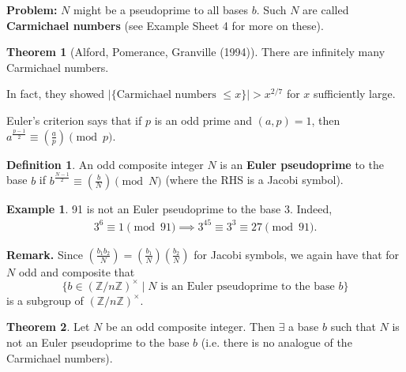 \documentclass{article}
\theoremstyle{definition}
\newtheorem{theorem}{Theorem}[section]
\newtheorem{example}{Example}[section]
\newtheorem{defn}{Definition}[section]
\begin{document}
\textbf{Problem:} $N$ might be a pseudoprime to all bases $b$. Such $N$ are called \textbf{Carmichael numbers} (see Example Sheet 4 for more on these).

\begin{theorem}[Alford, Pomerance, Granville (1994)]
    There are infinitely many Carmichael numbers.
\end{theorem}
In fact, they showed $|\{\text{Carmichael numbers }\le x\}|>x^{2/7}$ for $x$ sufficiently large.
\vspace{1mm}

Euler's criterion says that if $p$ is an odd prime and $(a,p)=1$, then $a^{\frac{p-1}{2}} \equiv \left( \frac{a}{p} \right) \pmod{p}$.
\begin{defn}
    An odd composite integer $N$ is an \textbf{Euler pseudoprime} to the base $b$ if $b^{\frac{N-1}{2}} \equiv \left( \frac{b}{N} \right) \pmod{N}$ (where the RHS is a Jacobi symbol). 
\end{defn}
\begin{example}
    91 is not an Euler pseudoprime to the base 3. Indeed,
    \begin{align*}
        3^6 \equiv 1 \pmod{91} \implies 3^{45} \equiv 3^{3} \equiv 27 \pmod{91}.
    \end{align*}
\end{example}
\textbf{Remark.} Since $\left( \frac{b_1b_2}{N} \right) =\left( \frac{b_1}{N} \right) \left( \frac{b_2}{N} \right)$ for Jacobi symbols, we again have that for $N$ odd and composite that \[
\{b \in (\mathbb{Z}/n\mathbb{Z})^\times \mid N\text{ is an Euler pseudoprime to the base }b\}
\]
is a subgroup of $(\mathbb{Z}/n\mathbb{Z})^\times$.
\begin{theorem}
    Let $N$ be an odd composite integer. Then $\exists $ a base $b$ such that $N$ is not an Euler pseudoprime to the base $b$ (i.e. there is no analogue of the Carmichael numbers).
\end{theorem}
\end{document}
